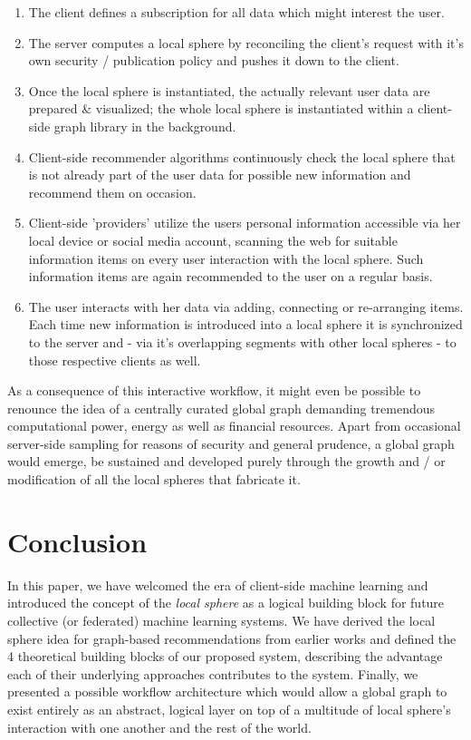 \documentclass{llncs}
\begin{document}
\begin{enumerate}
	\item The client defines a subscription for all data which might interest the user.
	\item The server computes a local sphere by reconciling the client's request with it's own security / publication policy and pushes it down to the client.
	\item Once the local sphere is instantiated, the actually relevant user data are prepared \& visualized; the whole local sphere is instantiated within a client-side graph library in the background.
	\item Client-side recommender algorithms continuously check the local sphere that is not already part of the user data for possible new information and recommend them on occasion.
	\item Client-side 'providers' utilize the users personal information accessible via her local device or social media account, scanning the web for suitable information items on every user interaction with the local sphere. Such information items are again recommended to the user on a regular basis.
	\item The user interacts with her data via adding, connecting or re-arranging items. Each time new information is introduced into a local sphere it is synchronized to the server and - via it's overlapping segments with other local spheres - to those respective clients as well.
\end{enumerate}

As a consequence of this interactive workflow, it might even be possible to renounce the idea of a centrally curated global graph demanding tremendous computational power, energy as well as financial resources. Apart from occasional server-side sampling for reasons of security and general prudence, a global graph would emerge, be sustained and developed purely through the growth and / or modification of all the local spheres that fabricate it.


\section{Conclusion}
\label{sect:conclusion}

In this paper, we have welcomed the era of client-side machine learning and introduced the concept of the \textit{local sphere} as a logical building block for future collective (or federated) machine learning systems. We have derived the local sphere idea for graph-based recommendations from earlier works and defined the 4 theoretical building blocks of our proposed system, describing the advantage each of their underlying approaches contributes to the system. Finally, we presented a possible workflow architecture which would allow a global graph to exist entirely as an abstract, logical layer on top of a multitude of local sphere's interaction with one another and the rest of the world.

\newpage



\end{document}
